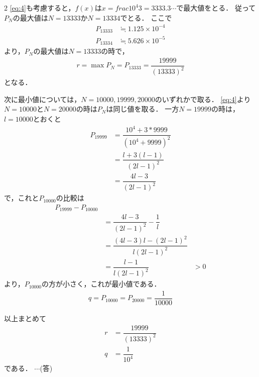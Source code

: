 \documentclass[../../main.tex]{subfiles}
\begin{document}
\begin{multicols}{2}
  \cref{eq:4}も考慮すると，$f(x)$は$x=frac{10^4}{3} = 3333.3\cdots$で最大値をとる．
  従って$P_N$の最大値は$N=13333$か$N=13334$でとる．
  ここで
  \begin{align}
    P_{13333} & \fallingdotseq 1.125 \times 10^{-4} \\
    P_{13334} & \fallingdotseq 5.626 \times 10^{-5}
  \end{align}
  より，$P_N$の最大値は$N=13333$の時で，
  \begin{align}
    r = \max P_N = P_{13333} = \dfrac{19999}{(13333)^2}
  \end{align}
  となる．

  次に最小値については，$N=10000,19999,20000$のいずれかで取る．
  \cref{eq:4}より$N=10000$と$N=20000$の時は$P_N$は同じ値を取る．
  一方$N=19999$の時は，$l=10000$とおくと
  \begin{align}
    P_{19999}
    & = \dfrac{10^4+3*9999}{(10^4+9999)^2} \\
    & = \dfrac{l+3(l-1)}{(2l-1)^2}         \\
    & = \dfrac{4l-3}{(2l-1)^2}
  \end{align}
  で，これと$P_{10000}$の比較は
  \begin{align}
    P_{19999} - P_{10000}                   \\
    & =\dfrac{4l-3}{(2l-1)^2} - \dfrac{1}{l} \\
    & = \dfrac{(4l-3)l-(2l-1)^2}{l(2l-1)^2} \\
    & = \dfrac{l-1}{l(2l-1)^2}
    & >0
  \end{align}
  より，$P_{10000}$の方が小さく，これが最小値である．
  \begin{align}
    q = P_{10000} = P_{20000} = \dfrac{1}{10000}
  \end{align}

  以上まとめて
  \begin{align}
    r & = \dfrac{19999}{(13333)^2} \\
    q & = \dfrac{1}{10^4}
  \end{align}
  である．  $\cdots$(答)


\end{multicols}
\end{document}
